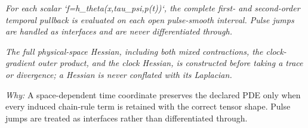 \documentclass[10pt,a4paper]{article}
\begin{document}
\begin{enumerate}[leftmargin=*,start=3]
\noindent\emph{For each scalar `f=h\_theta(x,tau\_psi,p(t))`, the complete first- and second-order temporal pullback is evaluated on each open pulse-smooth interval. Pulse jumps are handled as interfaces and are never differentiated through.}
\par{}
\noindent\emph{The full physical-space Hessian, including both mixed contractions, the clock-gradient outer product, and the clock Hessian, is constructed before taking a trace or divergence;\allowbreak{} a Hessian is never conflated with its Laplacian.}
\par{}
\par\emph{Why:} A space-dependent time coordinate preserves the declared PDE only when every induced chain-rule term is retained with the correct tensor shape. Pulse jumps are treated as interfaces rather than differentiated through.

\end{enumerate}
\end{document}
